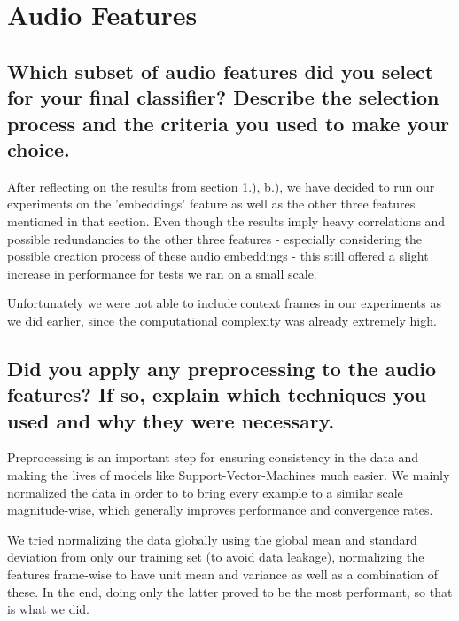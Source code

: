 
\section{Audio Features}
\label{sec:Audio Features}



\subsection{Which subset of audio features did you select for your final classifier? Describe the selection process and the criteria you used to make your choice.}
\label{sec:Audio Features:a}

After reflecting on the results from section \hyperref[sec:Labeling Function:b]{1.), b.)}, we have decided to run our experiments on the 'embeddings' feature as well as the other three features mentioned in that section. Even though the results imply heavy correlations and possible redundancies to the other three features - especially considering the possible creation process of these audio embeddings -  this still offered a slight increase in performance for tests we ran on a small scale.

Unfortunately we were not able to include context frames in our experiments as we did earlier, since the computational complexity was already extremely high.


\subsection{Did you apply any preprocessing to the audio features? If so, explain which techniques you used and why they were necessary.}
\label{sec:Audio Features:b}

Preprocessing is an important step for ensuring consistency in the data and making the lives of models like Support-Vector-Machines much easier. We mainly normalized the data in order to to bring every example to a similar scale magnitude-wise, which generally improves performance and convergence rates.

We tried normalizing the data globally using the global mean and standard deviation from only our training set (to avoid data leakage), normalizing the features frame-wise to have unit mean and variance as well as a combination of these. In the end, doing only the latter proved to be the most performant, so that is what we did.




